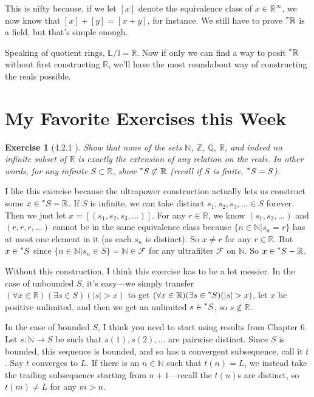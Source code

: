 \documentclass{article}
\newcommand{\reals}{\mathbb{R}}
\newcommand{\hreals}{\prescript{*}{}{\mathbb{R}}}
\newcommand{\nats}{\mathbb{N}}
\newcommand{\hr}[1]{\prescript{*}{}{#1}}
\newtheorem*{exercise}{Exercise}
\begin{document}
This is nifty because, if we let $[x]$ denote the equivalence class of $x \in \reals^\infty$, we now know that $[x] + [y] = [x+y]$, for instance. We still have to prove $\hreals$ is a field, but that's simple enough.

Speaking of quotient rings, $\mathbb{L} / \mathbb{I} = \reals$. Now if only we can find a way to posit $\hreals$ without first constructing $\reals$, we'll have the most roundabout way of constructing the reals possible.

\section*{My Favorite Exercises this Week}
\begin{exercise}[4.2.1 \cite{goldblatt1998}]
Show that none of the sets $\nats$, $\mathbb{Z}$, $\mathbb{Q}$, $\reals$, and indeed no infinite subset of $\reals$ is exactly the extension of any relation on the reals. In other words, for any infinite $S \subset \reals$, show $\hr{S} \not\subset \reals$ (recall if $S$ is finite, $\hr{S} = S$).
\end{exercise}

I like this exercise because the ultrapower construction actually lets us construct some $x \in \hr{S} - \reals$. If $S$ is infinite, we can take distinct $s_1, s_2, s_3, \ldots \in S$ forever. Then we just let $x = [(s_1, s_2, s_3, \ldots)]$. For any $r \in \reals$, we know $(s_1, s_2, \ldots)$ and $(r, r, r, \ldots)$ cannot be in the same equivalence class because $\{n \in \nats | s_n = r\}$ has at most one element in it (as each $s_n$ is distinct). So $x \neq r$ for any $r \in \reals$. But $x \in \hr{S}$ since $\{n \in \nats | s_n \in S\} = \nats \in \mathcal{F}$ for any ultrafilter $\mathcal{F}$ on $\nats$. So $x \in \hr{S} - \reals$.

Without this construction, I think this exercise has to be a lot messier. In the case of unbounded $S$, it's easy---we simply transfer $(\forall x \in \reals)(\exists s \in S)(|s| > x)$ to get $(\forall x \in \reals)(\exists s \in \hr{S})(|s| > x)$, let $x$ be positive unlimited, and then we get an unlimited $s \in \hr{S}$, so $s \notin \reals$. 

In the case of bounded $S$, I think you need to start using results from Chapter 6. Let $s: \nats \to S$ be such that $s(1), s(2), \ldots$ are pairwise distinct. Since $S$ is bounded, this sequence is bounded, and so has a convergent subsequence, call it $t$. Say $t$ converges to $L$. If there is an $n \in \nats$ such that $t(n) = L$, we instead take the trailing subsequence starting from $n+1$---recall the $t(n)$s are distinct, so $t(m) \neq L$ for any $m > n$. 
\end{document}
